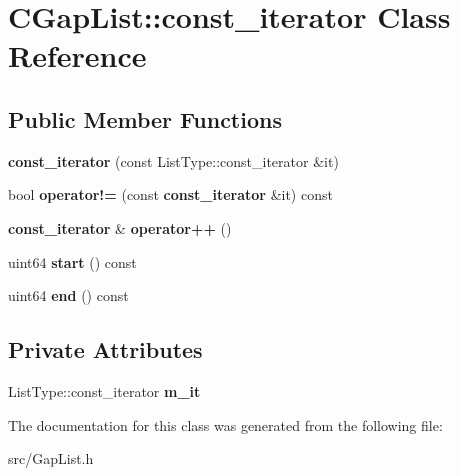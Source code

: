 \section{CGapList::const\_\-iterator Class Reference}
\label{classCGapList_1_1const__iterator}
\subsection*{Public Member Functions}
\begin{DoxyCompactItemize}
\item 
{\bfseries const\_\-iterator} (const ListType::const\_\-iterator \&it)\label{classCGapList_1_1const__iterator_a2663f595d39d43d314289727a7eebb70}

\item 
bool {\bfseries operator!=} (const {\bf const\_\-iterator} \&it) const \label{classCGapList_1_1const__iterator_ade4b2ccc01f59848695b9ecfe0bbd86c}

\item 
{\bf const\_\-iterator} \& {\bfseries operator++} ()\label{classCGapList_1_1const__iterator_ac9ac83de6d1cc979cbb10809711dc86f}

\item 
uint64 {\bfseries start} () const \label{classCGapList_1_1const__iterator_a2483ba46f39f1725c4404b6eb764b6d0}

\item 
uint64 {\bfseries end} () const \label{classCGapList_1_1const__iterator_a5beba2aa6aaf58b11d2bc6901109a58e}

\end{DoxyCompactItemize}
\subsection*{Private Attributes}
\begin{DoxyCompactItemize}
\item 
ListType::const\_\-iterator {\bfseries m\_\-it}\label{classCGapList_1_1const__iterator_a80bc95bfa5f77c13d842e2af2be2494d}

\end{DoxyCompactItemize}


The documentation for this class was generated from the following file:\begin{DoxyCompactItemize}
\item 
src/GapList.h\end{DoxyCompactItemize}
